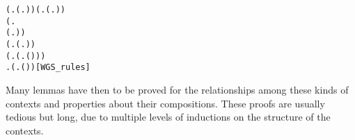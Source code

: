 \begin{alltt}
\HOLTokenTurnstile{} (\HOLSymConst{\HOLTokenForall{}}.  (\HOLTokenLambda{}. )) \HOLSymConst{\HOLTokenConj{}} (\HOLSymConst{\HOLTokenForall{}} .   \HOLSymConst{\HOLTokenImp{}}  (\HOLTokenLambda{}.  )) \HOLSymConst{\HOLTokenConj{}}
   (\HOLSymConst{\HOLTokenForall{}}   .
          \HOLSymConst{\HOLTokenConj{}}   \HOLSymConst{\HOLTokenImp{}}
         (\HOLTokenLambda{}.   \HOLSymConst{\ensuremath{+}}  )) \HOLSymConst{\HOLTokenConj{}}
   (\HOLSymConst{\HOLTokenForall{}} .   \HOLSymConst{\HOLTokenConj{}}   \HOLSymConst{\HOLTokenImp{}}  (\HOLTokenLambda{}.   \HOLSymConst{\ensuremath{\parallel}}  )) \HOLSymConst{\HOLTokenConj{}}
   (\HOLSymConst{\HOLTokenForall{}} .   \HOLSymConst{\HOLTokenImp{}}  (\HOLTokenLambda{}. \HOLSymConst{\ensuremath{\nu}}  ( ))) \HOLSymConst{\HOLTokenConj{}}
   \HOLSymConst{\HOLTokenForall{}} .   \HOLSymConst{\HOLTokenImp{}}  (\HOLTokenLambda{}.  ( ) )\hfill{[WGS_rules]}
\end{alltt}

Many lemmas have then to be proved for the
 relationships among these kinds of contexts and properties about their
 compositions. These proofs are usually tedious but long,  due to multiple levels of
 inductions on the structure of the contexts.

